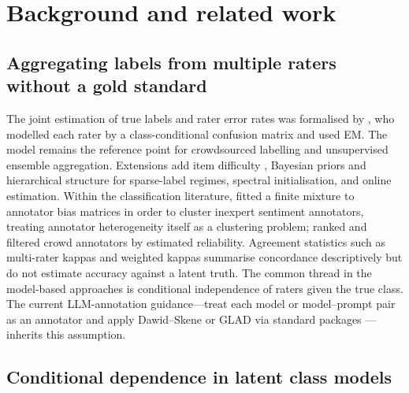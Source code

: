 \section{Background and related work}\label{sec:background}

\subsection{Aggregating labels from multiple raters without a gold standard}

The joint estimation of true labels and rater error rates was formalised by \citet{Dawid1979}, who modelled each rater by a class-conditional confusion matrix and used EM. The model remains the reference point for crowdsourced labelling and unsupervised ensemble aggregation. Extensions add item difficulty \citep[GLAD;][]{Whitehill2009}, Bayesian priors and hierarchical structure for sparse-label regimes, spectral initialisation, and online estimation. Within the classification literature, \citet{Salter-Townshend2014} fitted a finite mixture to annotator bias matrices in order to cluster inexpert sentiment annotators, treating annotator heterogeneity itself as a clustering problem; \citet{Raykar2012} ranked and filtered crowd annotators by estimated reliability. Agreement statistics such as multi-rater kappas \citep{Warrens2010} and weighted kappas \citep{Warrens2013} summarise concordance descriptively but do not estimate accuracy against a latent truth. The common thread in the model-based approaches is conditional independence of raters given the true class. The current LLM-annotation guidance---treat each model or model--prompt pair as an annotator and apply Dawid--Skene or GLAD via standard packages \citep{Camuffo2026}---inherits this assumption.

\subsection{Conditional dependence in latent class models}

